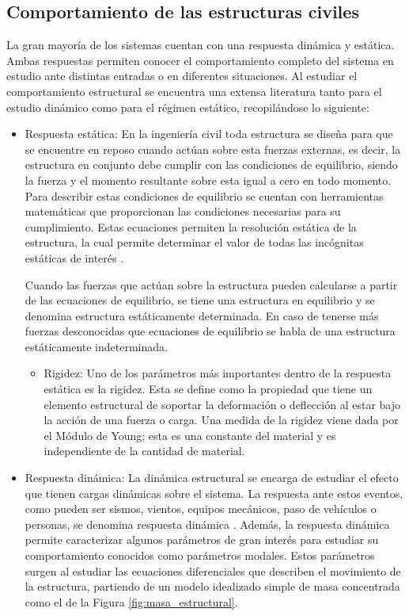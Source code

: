 \subsection{Comportamiento de las estructuras civiles}

La gran mayoría de los sistemas cuentan con una respuesta dinámica y estática. Ambas respuestas permiten conocer el comportamiento completo del sistema en estudio ante distintas entradas o en diferentes situaciones. Al estudiar el comportamiento estructural se encuentra una extensa literatura tanto para el estudio dinámico como para el régimen estático, recopilándose lo siguiente:

\begin{itemize}
    \item{Respuesta estática}: En la ingeniería civil toda estructura se diseña para que se encuentre en reposo cuando actúan sobre esta fuerzas externas, es decir, la estructura en conjunto debe cumplir con las condiciones de equilibrio, siendo la fuerza y el momento resultante sobre esta igual a cero en todo momento. Para describir estas condiciones de equilibrio se cuentan con herramientas matemáticas que proporcionan las condiciones necesarias para su cumplimiento. Estas ecuaciones permiten la resolución estática de la estructura, la cual permite determinar el valor de todas las incógnitas estáticas de interés \citep{basset2014analisis}.
    
    \indent Cuando las fuerzas que actúan sobre la estructura pueden calcularse a partir de las ecuaciones de equilibrio, se tiene una estructura en equilibrio y se denomina estructura estáticamente determinada. En caso de tenerse más fuerzas desconocidas que ecuaciones de equilibrio se habla de una estructura estáticamente indeterminada.

        \begin{itemize}
            \item Rigidez: Uno de los parámetros más importantes dentro de la respuesta estática es la rigidez. Esta se define como la propiedad que tiene un elemento estructural de soportar la deformación o deflección al estar bajo la acción de una fuerza o carga. Una medida de la rigidez viene dada por el Módulo de Young; esta es una constante del material y es independiente de la cantidad de material.
        \end{itemize}

    \item{Respuesta dinámica}: La dinámica estructural se encarga de estudiar el efecto que tienen cargas dinámicas sobre el sistema. La respuesta ante estos eventos, como pueden ser sismos, vientos, equipos mecánicos, paso de vehículos o personas, se denomina respuesta dinámica \citep{hurtado2000}. Además, la respuesta dinámica permite caracterizar algunos parámetros de gran interés para estudiar su comportamiento conocidos como parámetros modales. Estos parámetros surgen al estudiar las ecuaciones diferenciales que describen el movimiento de la estructura, partiendo de un modelo idealizado simple de masa concentrada como el de la Figura \ref{fig:masa_estructural}.
    

\end{itemize}
